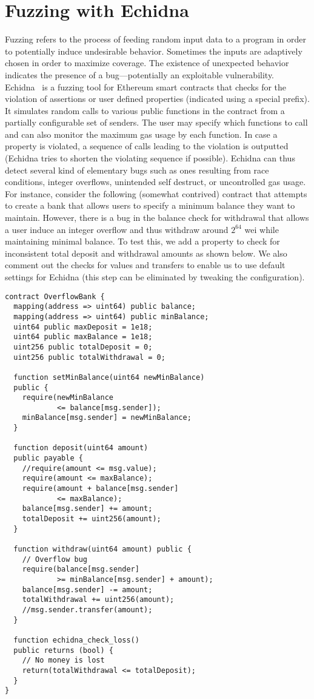 \section{Fuzzing with Echidna}
Fuzzing refers to the process of feeding random input data to a program in order to potentially induce undesirable behavior. Sometimes the inputs are adaptively chosen in order to maximize coverage. The existence of unexpected behavior indicates the presence of a bug---potentially an exploitable vulnerability. Echidna~\cite{echidna} is a fuzzing tool for Ethereum smart contracts that checks for the violation of assertions or user defined properties (indicated using a special prefix). It simulates random calls to various public functions in the contract from a partially configurable set of senders. The user may specify which functions to call and can also monitor the maximum gas usage by each function. In case a property is violated, a sequence of calls leading to the violation is outputted (Echidna tries to shorten the violating sequence if possible). Echidna can thus detect several kind of elementary bugs such as ones resulting from race conditions, integer overflows, unintended self destruct, or uncontrolled gas usage. For instance, consider the following (somewhat contrived) contract that attempts to create a bank that allows users to specify a minimum balance they want to maintain. However, there is a bug in the balance check for withdrawal that allows a user induce an integer overflow and thus withdraw around $2^{64}$ wei while maintaining minimal balance. To test this, we add a property to check for inconsistent total deposit and withdrawal amounts as shown below. We also comment out the checks for values and transfers to enable us to use default settings for Echidna (this step can be eliminated by tweaking the configuration).
\begin{lstlisting}[basicstyle=\small]
contract OverflowBank {
  mapping(address => uint64) public balance;  
  mapping(address => uint64) public minBalance;   
  uint64 public maxDeposit = 1e18;
  uint64 public maxBalance = 1e18; 
  uint256 public totalDeposit = 0;
  uint256 public totalWithdrawal = 0;

  function setMinBalance(uint64 newMinBalance) 
  public {
    require(newMinBalance 
            <= balance[msg.sender]);
    minBalance[msg.sender] = newMinBalance;
  }

  function deposit(uint64 amount) 
  public payable {
    //require(amount <= msg.value);
    require(amount <= maxBalance);
    require(amount + balance[msg.sender] 
            <= maxBalance);
    balance[msg.sender] += amount;
    totalDeposit += uint256(amount);
  }

  function withdraw(uint64 amount) public {
    // Overflow bug
    require(balance[msg.sender] 
            >= minBalance[msg.sender] + amount); 
    balance[msg.sender] -= amount;
    totalWithdrawal += uint256(amount);
    //msg.sender.transfer(amount);
  }

  function echidna_check_loss() 
  public returns (bool) {
    // No money is lost
    return(totalWithdrawal <= totalDeposit); 
  }
}
\end{lstlisting}
